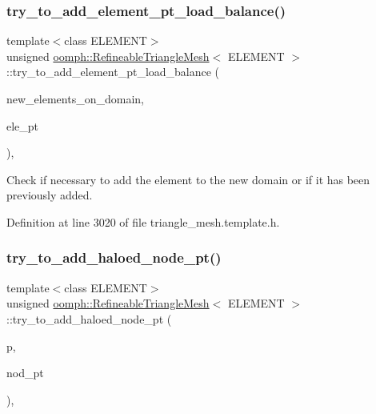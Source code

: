 \subsubsection{\texorpdfstring{try\+\_\+to\+\_\+add\+\_\+element\+\_\+pt\+\_\+load\+\_\+balance()}{try\_to\_add\_element\_pt\_load\_balance()}}
{\footnotesize\ttfamily template$<$class E\+L\+E\+M\+E\+NT$>$ \\
unsigned \hyperlink{classoomph_1_1RefineableTriangleMesh}{oomph\+::\+Refineable\+Triangle\+Mesh}$<$ E\+L\+E\+M\+E\+NT $>$\+::try\+\_\+to\+\_\+add\+\_\+element\+\_\+pt\+\_\+load\+\_\+balance (\begin{DoxyParamCaption}\item[{Vector$<$ Finite\+Element $\ast$$>$ \&}]{new\+\_\+elements\+\_\+on\+\_\+domain,  }\item[{Finite\+Element $\ast$\&}]{ele\+\_\+pt }\end{DoxyParamCaption})\hspace{0.3cm}{\ttfamily [inline]}, {\ttfamily [protected]}}



Check if necessary to add the element to the new domain or if it has been previously added. 



Definition at line 3020 of file triangle\+\_\+mesh.\+template.\+h.

\mbox{\label{classoomph_1_1RefineableTriangleMesh_a0bc1283a0cf4ea45abefea1930ef748a}} 
\subsubsection{\texorpdfstring{try\+\_\+to\+\_\+add\+\_\+haloed\+\_\+node\+\_\+pt()}{try\_to\_add\_haloed\_node\_pt()}}
{\footnotesize\ttfamily template$<$class E\+L\+E\+M\+E\+NT$>$ \\
unsigned \hyperlink{classoomph_1_1RefineableTriangleMesh}{oomph\+::\+Refineable\+Triangle\+Mesh}$<$ E\+L\+E\+M\+E\+NT $>$\+::try\+\_\+to\+\_\+add\+\_\+haloed\+\_\+node\+\_\+pt (\begin{DoxyParamCaption}\item[{const unsigned \&}]{p,  }\item[{Node $\ast$\&}]{nod\+\_\+pt }\end{DoxyParamCaption})\hspace{0.3cm}{\ttfamily [inline]}, {\ttfamily [protected]}}



